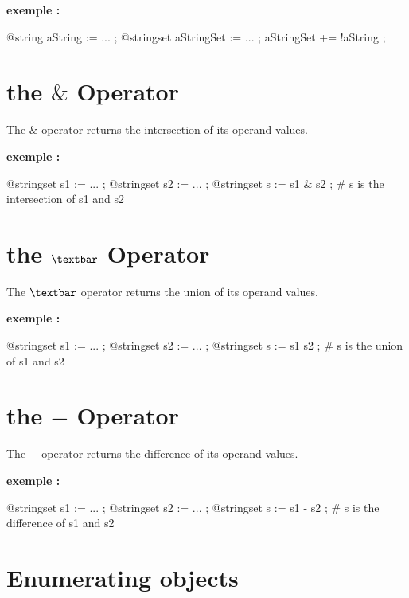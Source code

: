 \textbf{exemple :}
\begin{galgascode}
@string aString := ... ;
@stringset aStringSet := ... ;
aStringSet += !aString ;
\end{galgascode}




\section{the \emph{$\&$} Operator}

The \emph{$\&$} operator returns the intersection of its operand values.

\textbf{exemple :}
\begin{galgascode}
@stringset s1 := ... ;
@stringset s2 := ... ;
@stringset s := s1 & s2 ; # s is the intersection of s1 and s2
\end{galgascode}






\section{the \emph{$\textbar$} Operator}

The \emph{$\textbar$} operator returns the union of its operand values.

\textbf{exemple :}
\begin{galgascode}
@stringset s1 := ... ;
@stringset s2 := ... ;
@stringset s := s1 \textbar s2 ; \# s is the union of s1 and s2
\end{galgascode}






\section{the \emph{$-$} Operator}

The \emph{$-$} operator returns the difference of its operand values.

\textbf{exemple :}
\begin{galgascode}
@stringset s1 := ... ;
@stringset s2 := ... ;
@stringset s := s1 - s2 ; \# s is the difference of s1 and s2
\end{galgascode}








\section{Enumerating  objects}


